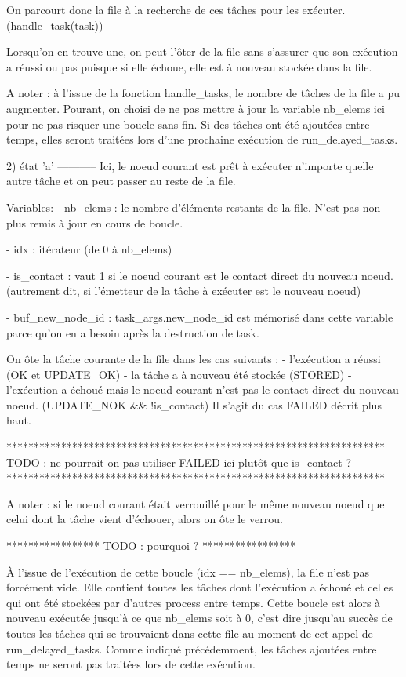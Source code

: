 On parcourt donc la file à la recherche de ces tâches pour les exécuter. (handle_task(task))

Lorsqu'on en trouve une, on peut l'ôter de la file sans s'assurer que son exécution a réussi ou pas
puisque si elle échoue, elle est à nouveau stockée dans la file.

A noter : à l'issue de la fonction handle_tasks, le nombre de tâches de la file a pu augmenter.
Pourant, on choisi de ne pas mettre à jour la variable nb_elems ici pour ne pas risquer une boucle
sans fin. Si des tâches ont été ajoutées entre temps, elles seront traitées lors d'une prochaine
exécution de run_delayed_tasks.

2) état 'a'
-----------
Ici, le noeud courant est prêt à exécuter n'importe quelle autre tâche et on peut passer au reste de
la file.

Variables:
    - nb_elems   :      le nombre d'éléments restants de la file.
                        N'est pas non plus remis à jour en cours de boucle.

    - idx        :      itérateur (de 0 à nb_elems)

    - is_contact :      vaut 1 si le noeud courant est le contact direct du nouveau noeud.
                        (autrement dit, si l'émetteur de la tâche à exécuter est le nouveau noeud)

    - buf_new_node_id : task_args.new_node_id est mémorisé dans cette variable parce qu'on en a besoin
                        après la destruction de task.

    On ôte la tâche courante de la file dans les cas suivants :
        - l'exécution a réussi (OK et UPDATE_OK)
        - la tâche a à nouveau été stockée (STORED)
        - l'exécution a échoué mais le noeud courant n'est pas le contact direct du nouveau noeud.
          (UPDATE_NOK && !is_contact)
          Il s'agit du cas FAILED décrit plus haut.

*********************************************************************
TODO : ne pourrait-on pas utiliser FAILED ici plutôt que is_contact ?
*********************************************************************

A noter : si le noeud courant était verrouillé pour le même nouveau noeud que
celui dont la tâche vient d'échouer, alors on ôte le verrou.

*****************
TODO : pourquoi ?
*****************

À l'issue de l'exécution de cette boucle (idx == nb_elems), la file n'est pas forcément vide. Elle
contient toutes les tâches dont l'exécution a échoué et celles qui ont été stockées par d'autres
process entre temps. Cette boucle est alors à nouveau exécutée jusqu'à ce que nb_elems soit à 0,
c'est dire jusqu'au succès de toutes les tâches qui se trouvaient dans cette file au moment de
cet appel de run_delayed_tasks. Comme indiqué précédemment, les tâches ajoutées entre temps ne
seront pas traitées lors de cette exécution.

